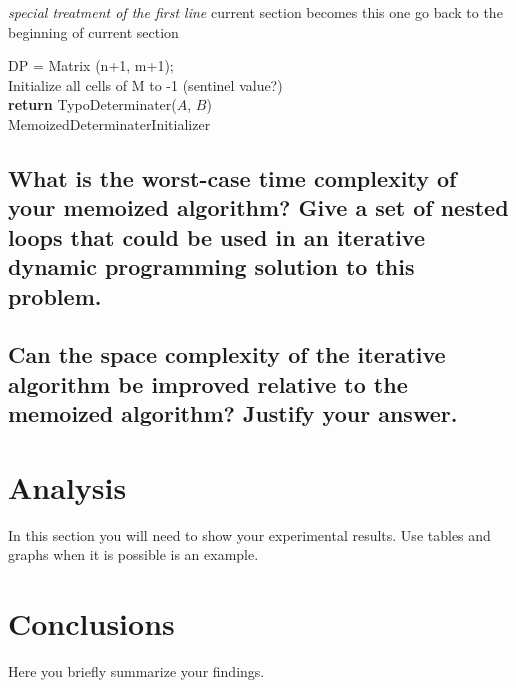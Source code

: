 \documentclass[letterpaper,12pt]{article}
\begin{document}
\IncMargin{1em}
\begin{algorithm}
\BlankLine
\emph{special treatment of the first line}\;
current section becomes this one\;
{
go back to the beginning of current section\;
}

{DP = Matrix (n+1, m+1);}\\ 
{Initialize all cells of M to -1 (sentinel value?)}\\
\textbf{return} {TypoDeterminater($A$, $B$)}\\
\caption{MemoizedDeterminaterInitializer\label{IR2}}

\end{algorithm}\DecMargin{1em}


\subsection{What is the worst-case time complexity of your memoized algorithm? Give a set of nested loops that could be used in an iterative dynamic programming solution to this problem.}


\subsection{Can the space complexity of the iterative algorithm be improved relative to the memoized algorithm? Justify your answer.}




\section{Analysis}

In this section you will need to show your experimental results. Use tables and
graphs when it is possible is an example.


\section{Conclusions}
Here you briefly summarize your findings.
\end{document}
